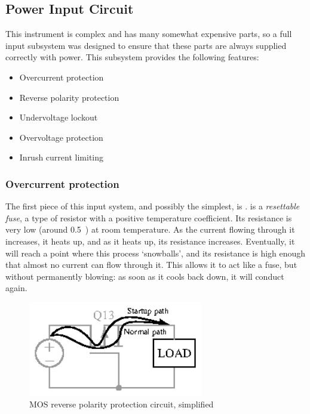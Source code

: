 \subsection{Power Input Circuit}


This instrument is complex and has many somewhat expensive parts, so a full
input subsystem was designed to ensure that these parts are always supplied
correctly with power. This subsystem provides the following features:

\begin{itemize}
\item{Overcurrent protection}
\item{Reverse polarity protection}
\item{Undervoltage lockout}
\item{Overvoltage protection}
\item{Inrush current limiting}
\end{itemize}

\subsubsection{Overcurrent protection}

The first piece of this input system, and possibly the simplest, is
.  is a \emph{resettable fuse}, a type of resistor
with a positive temperature coefficient. Its resistance is very low
(around 0.5~\Ohm) at room temperature. As the current flowing through it
increases, it heats up, and as it heats up, its resistance increases.
Eventually, it will reach a point where this process `snowballs', and its
resistance is high enough that almost no current can flow through it. This
allows it to act like a fuse, but without permanently blowing: as soon as it
cools back down, it will conduct again.

\begin{figure}[H]
\centering
\includegraphics[width=3in]{too/mosrpp}
\caption{MOS reverse polarity protection circuit, simplified}
\label{fig:mosrpp}
\end{figure}

